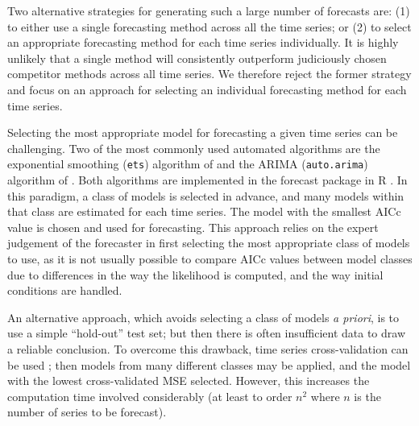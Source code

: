 \documentclass[11pt,a4paper,]{article}
\begin{document}
Two alternative strategies for generating such a large number of forecasts are: (1) to either use a single forecasting method across all the time series; or (2) to select an appropriate forecasting method for each time series individually. It is highly unlikely that a single method will consistently outperform judiciously chosen competitor methods across all time series. We therefore reject the former strategy and focus on an approach for selecting an individual forecasting method for each time series.

Selecting the most appropriate model for forecasting a given time series can be challenging. Two of the most commonly used automated algorithms are the exponential smoothing (\texttt{ets}) algorithm of \textcite{Hyndman2002} and the ARIMA (\texttt{auto.arima}) algorithm of \textcite{Hyndman2008}. Both algorithms are implemented in the forecast package in R \autocites{Rcore}{forecast}. In this paradigm, a class of models is selected in advance, and many models within that class are estimated for each time series. The model with the smallest AICc value is chosen and used for forecasting. This approach relies on the expert judgement of the forecaster in first selecting the most appropriate class of models to use, as it is not usually possible to compare AICc values between model classes due to differences in the way the likelihood is computed, and the way initial conditions are handled.

An alternative approach, which avoids selecting a class of models \emph{a priori}, is to use a simple ``hold-out'' test set; but then there is often insufficient data to draw a reliable conclusion. To overcome this drawback, time series cross-validation can be used \autocites{racine2000consistent}{hyndman2014forecasting}; then models from many different classes may be applied, and the model with the lowest cross-validated MSE selected. However, this increases the computation time involved considerably (at least to order \(n^2\) where \(n\) is the number of series to be forecast).
\end{document}
